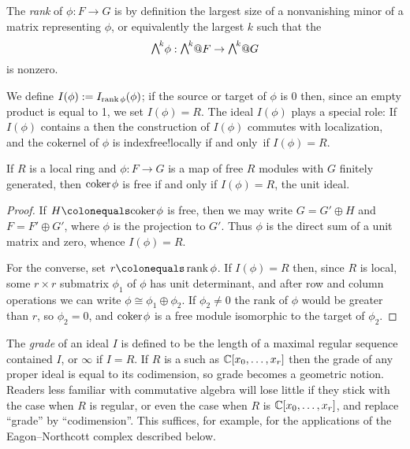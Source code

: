 The \emph{rank} of $\phi: F\to G$ is by definition the largest size of a nonvanishing
%
minor of a matrix representing $\phi$,
or equivalently the largest $k$ such that the
%
$$\mwedge^{k}\phi : \mwedge^{k}@F \to \mwedge^{k}@G$$
is nonzero. 

We define
$I(\phi): = I_{\operatorname{rank} \phi}(\phi)$; if the source or target of $\phi$ is 0 then, since an empty
product is equal to 1,
we set $I(\phi) = R$.  The ideal $I(\phi)$ plays a special role: 
If $I(\phi)$ contains a 
%
then the construction of $I(\phi)$
commutes with localization, and the cokernel
of $\phi$
is  
index{free!locally}
 if and only~if $I(\phi) = R$. 

\begin{lemma}\label{free coker}
If $R$ is a local ring and $\phi: F\to G$ is a map of free $R$ modules
with $G$ finitely generated,
then ${\rm{coker}\kern1pt} \phi$ is free if and only if $I(\phi) = R$, the unit ideal.
\end{lemma}

\begin{proof}
 If $H \colonequals \coker \phi$ is free, then we may write
 $G = G'\oplus H$ and $F = F'\oplus G'$, where $\phi$ is the projection to $G'$.
 Thus $\phi$ is the direct sum of a unit matrix and zero, whence $I(\phi) = R$.
 
For the converse, set $r\colonequals \rank \phi$. If $I(\phi) = R$
then, since $R$ is local, some $r \times r$ submatrix $\phi_{1}$ of
$\phi$ has unit determinant, and after row and column operations we
can write $\phi \cong \phi_{1}\oplus \phi_{2}$. If $\phi_{2} \neq 0$
the rank of $\phi$ would be greater than $r$, so $\phi_{2} = 0$, and
${\rm{coker}\kern1pt} \phi$ is a free module isomorphic to the target of $\phi_{2}$.
\end{proof}

The \emph{grade} of an ideal $I$ is defined to be the length of a maximal regular
%
sequence
contained $I$, or $\infty$ if $I=R$. If $R$ is a
%
such as
${\mathbb C}[x_{0},\dots, x_{r}]$ then the grade
of any proper ideal is equal to its codimension, so grade becomes a
geometric notion.
Readers less familiar with commutative algebra will lose little if they
stick with the case when $R$ is
regular, or even the case when $R$ is ${\mathbb C}[x_{0},\dots, x_{r}]$,
and replace ``grade'' by ``codimension''. This
suffices, for example, for the applications
%
of the Eagon--Northcott complex described below.

